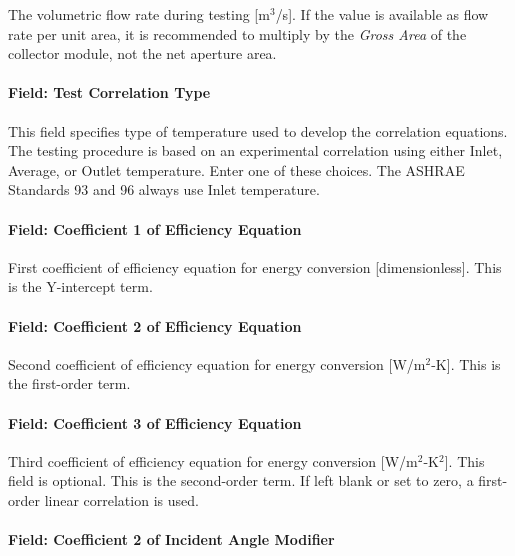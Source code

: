 The volumetric flow rate during testing {[}m\(^{3}\)/s{]}. If the value is available as flow rate per unit area, it is recommended to multiply by the \emph{Gross Area} of the collector module, not the net aperture area.

\paragraph{Field: Test Correlation Type}\label{field-test-correlation-type}

This field specifies type of temperature used to develop the correlation equations. The testing procedure is based on an experimental correlation using either Inlet, Average, or Outlet temperature. Enter one of these choices. The ASHRAE Standards 93 and 96 always use Inlet temperature.

\paragraph{Field: Coefficient 1 of Efficiency Equation}\label{field-coefficient-1-of-efficiency-equation}

First coefficient of efficiency equation for energy conversion {[}dimensionless{]}. This is the Y-intercept term.

\paragraph{Field: Coefficient 2 of Efficiency Equation}\label{field-coefficient-2-of-efficiency-equation}

Second coefficient of efficiency equation for energy conversion {[}W/m\(^{2}\)-K{]}. This is the first-order term.

\paragraph{Field: Coefficient 3 of Efficiency Equation}\label{field-coefficient-3-of-efficiency-equation}

Third coefficient of efficiency equation for energy conversion {[}W/m\(^{2}\)-K\(^{2}\){]}. This field is optional. This is the second-order term. If left blank or set to zero, a first-order linear correlation is used.

\paragraph{Field: Coefficient 2 of Incident Angle Modifier}\label{field-coefficient-2-of-incident-angle-modifier}

